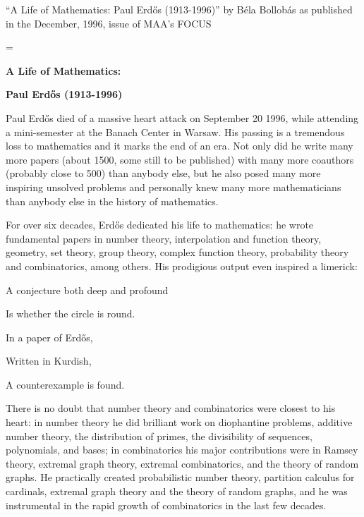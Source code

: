 ``A Life of Mathematics: Paul Erd\H{o}s (1913-1996)'' by B\'ela Bollob\'as as published in the December, 1996, issue of MAA's FOCUS



\magnification=
\vglue 1cm
\centerline
{\bf A Life of Mathematics:}

\centerline
{\bf Paul Erd\H{o}s (1913-1996)}

\bigskip
Paul Erd\H{o}s died of a massive heart attack on September 20 1996, 
while attending a mini-semester at the Banach Center in Warsaw. His
passing is a tremendous loss to mathematics and it marks the end of an era.
Not only did he write many more papers (about 1500, some still to be 
published) with many more coauthors (probably close to 500) than 
anybody else, but he also posed many more inspiring unsolved  problems  
and personally knew many more mathematicians than 
anybody else in the history of mathematics. 


For over six decades, Erd\H{o}s dedicated his life to mathematics: he 
wrote fundamental papers in number theory, interpolation and function 
theory, geometry, set theory, group theory, complex function theory, 
probability theory and combinatorics, among others. His prodigious output 
even inspired a limerick:

{\hskip1.5cm A conjecture both deep and profound}


{\hskip 1.5cm Is whether the circle is round. }


{\hskip2cm In a paper of Erd\H{o}s,}

{\hskip 2cm Written in Kurdish,}

{\hskip 1.5cm A counterexample is found.} 


\noindent
There is no doubt that number theory and combinatorics were closest to his 
heart: in number theory he did brilliant work on diophantine problems,
additive number theory, the distribution of primes, the divisibility of
sequences, polynomials, and bases;  in combinatorics his major 
contributions were in Ramsey theory, extremal graph theory, extremal 
combinatorics, and the theory of random graphs. He practically created 
probabilistic number theory, 
partition calculus for cardinals,
extremal graph theory and the theory of random graphs,
and he was instrumental in the rapid growth of combinatorics in the
last few decades.




